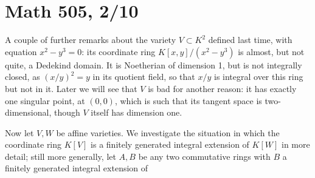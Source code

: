 \documentclass[10pt]{article}
\begin{document}
\section*{Math 505, 2/10}

A couple of further remarks about the variety $V\subset K^2$ defined
last time, with equation $x^2 - y^3 = 0$: its coordinate ring
$K[x,y]/(x^2 - y^3)$ is almost, but not quite, a Dedekind domain. It is
Noetherian of dimension 1, but is not integrally closed, as $(x/y)^2 =
y$ in its quotient field, so that $x/y$ is integral over this ring but
not in it. Later we will see that $V$ is bad for another reason: it has
exactly one singular point, at $(0,0)$, which is such that its tangent
space is two-dimensional, though $V$ itself has dimension one.

Now let $V,W$ be affine varieties. We investigate the situation in which
the coordinate ring $K[V]$ is a finitely generated integral extension of
$K[W]$ in more detail; still more generally, let $A,B$ be any two
commutative rings with $B$ a finitely generated integral extension of
\end{document}
